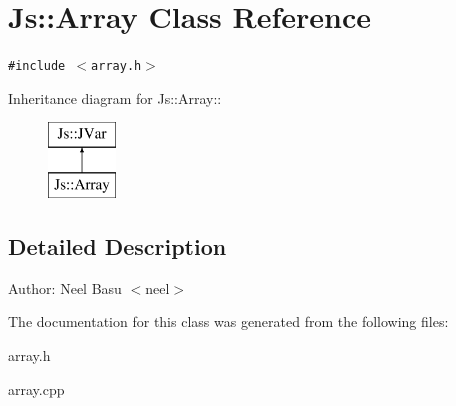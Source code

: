 \section{Js::Array Class Reference}
\label{classJs_1_1Array}
{\tt \#include $<$array.h$>$}

Inheritance diagram for Js::Array::\begin{figure}[H]
\begin{center}
\leavevmode
\includegraphics[height=2cm]{classJs_1_1Array}
\end{center}
\end{figure}


\subsection{Detailed Description}
\begin{Desc}
\item[Author:]Neel Basu $<$neel$>$ \end{Desc}


The documentation for this class was generated from the following files:\begin{CompactItemize}
\item 
array.h\item 
array.cpp\end{CompactItemize}
